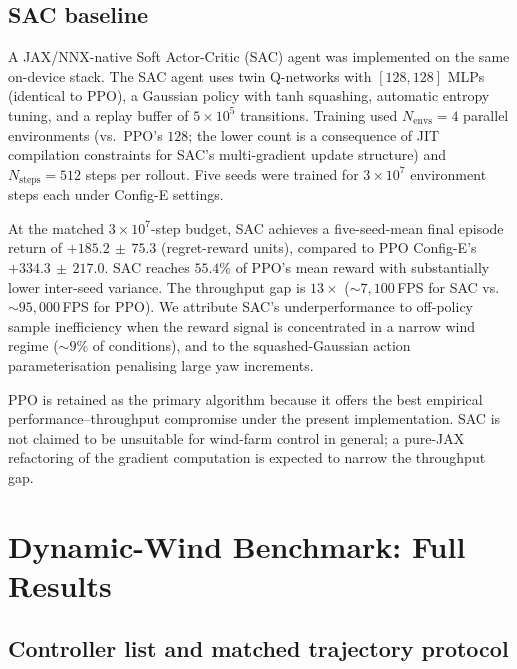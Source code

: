 \documentclass{article}
\begin{document}
\subsection{SAC baseline}

A JAX/NNX-native Soft Actor-Critic (SAC) agent was implemented on the same on-device stack. The SAC agent uses twin Q-networks with $[128,128]$ MLPs (identical to PPO), a Gaussian policy with tanh squashing, automatic entropy tuning, and a replay buffer of $5{\times}10^{5}$ transitions. Training used $N_\mathrm{envs}{=}4$ parallel environments (vs.\ PPO's $128$; the lower count is a consequence of JIT compilation constraints for SAC's multi-gradient update structure) and $N_\mathrm{steps}{=}512$ steps per rollout. Five seeds were trained for $3{\times}10^{7}$ environment steps each under Config-E settings.

At the matched $3{\times}10^{7}$-step budget, SAC achieves a five-seed-mean final episode return of $+185.2\,\pm\,75.3$ (regret-reward units), compared to PPO Config-E's $+334.3\,\pm\,217.0$. SAC reaches $55.4\%$ of PPO's mean reward with substantially lower inter-seed variance. The throughput gap is $13{\times}$ (${\sim}7{,}100$\,FPS for SAC vs.\ ${\sim}95{,}000$\,FPS for PPO). We attribute SAC's underperformance to off-policy sample inefficiency when the reward signal is concentrated in a narrow wind regime (${\sim}9\%$ of conditions), and to the squashed-Gaussian action parameterisation penalising large yaw increments.

PPO is retained as the primary algorithm because it offers the best empirical performance--throughput compromise under the present implementation. SAC is not claimed to be unsuitable for wind-farm control in general; a pure-JAX refactoring of the gradient computation is expected to narrow the throughput gap.

\section{Dynamic-Wind Benchmark: Full Results}\label{sec:dyn_full}

\subsection{Controller list and matched trajectory protocol}
\end{document}
